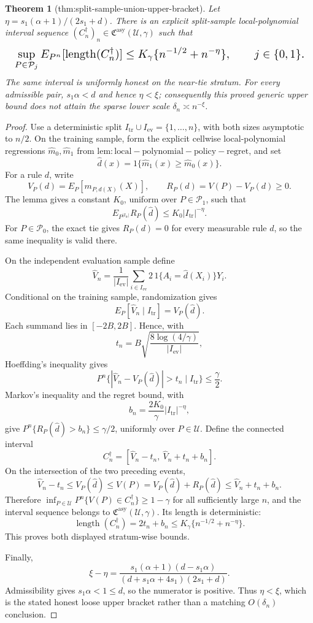 \documentclass{article}
\newtheorem{theorem}{Theorem}
\begin{document}
\begin{theorem}[thm:split-sample-union-upper-bracket]\label{thm:split-sample-union-upper-bracket}
Let \(\eta=s_1(\alpha+1)/(2s_1+d)\).  There is an explicit split-sample local-polynomial interval sequence \((C_n^\dagger)_n\in\mathfrak C^{\mathrm{asy}}(\mathcal U,\gamma)\) such that
\[
\makebox[\linewidth][c]{\resizebox{0.98\linewidth}{!}{\(\displaystyle \sup_{P\in\mathcal P_j}E_{P^n}[\operatorname{length}(C_n^\dagger)]
 \le K_\gamma\{n^{-1/2}+n^{-\eta}\},
 \qquad j\in\{0,1\}.\)}}
\]
The same interval is uniformly honest on the near-tie stratum.  For every admissible pair, \(s_1\alpha<d\) and hence \(\eta<\xi\); consequently this proved generic upper bound does not attain the sparse lower scale \(\delta_n\asymp n^{-\xi}\).
\end{theorem}
\begin{proof}
Use a deterministic split \(I_{\mathrm{tr}}\cup I_{\mathrm{ev}}=\{1,\ldots,n\}\), with both sizes asymptotic to \(n/2\).  On the training sample, form the explicit cellwise local-polynomial regressions \(\widehat m_0,\widehat m_1\) from \(\mathrm{lem:local-polynomial-policy-regret}\), and set
\[
 \widehat d(x)=1\{\widehat m_1(x)\ge\widehat m_0(x)\}.
\]
For a rule \(d\), write
\[
 V_P(d)=E_P[m_{P,d(X)}(X)],
 \qquad
 R_P(d)=V(P)-V_P(d)\ge0.
\]
The lemma gives a constant \(K_0\), uniform over \(P\in\mathcal P_1\), such that
\[
 E_{P^{|I_{\mathrm{tr}}|}}R_P(\widehat d)
 \le K_0|I_{\mathrm{tr}}|^{-\eta}.
\]
For \(P\in\mathcal P_0\), the exact tie gives \(R_P(d)=0\) for every measurable rule \(d\), so the same inequality is valid there.

On the independent evaluation sample define
\[
 \widehat V_n
 =\frac1{|I_{\mathrm{ev}}|}
 \sum_{i\in I_{\mathrm{ev}}}2\,1\{A_i=\widehat d(X_i)\}Y_i.
\]
Conditional on the training sample, randomization gives
\[
 E_P[\widehat V_n\mid I_{\mathrm{tr}}]=V_P(\widehat d).
\]
Each summand lies in \([-2B,2B]\).  Hence, with
\[
 t_n=B\sqrt{\frac{8\log(4/\gamma)}{|I_{\mathrm{ev}}|}},
\]
Hoeffding's inequality gives
\[
 P^n\{|\widehat V_n-V_P(\widehat d)|>t_n\mid I_{\mathrm{tr}}\}\le\frac\gamma2.
\]
Markov's inequality and the regret bound, with
\[
 b_n=\frac{2K_0}{\gamma}|I_{\mathrm{tr}}|^{-\eta},
\]
give \(P^n\{R_P(\widehat d)>b_n\}\le\gamma/2\), uniformly over \(P\in\mathcal U\).  Define the connected interval
\[
 C_n^\dagger=[\widehat V_n-t_n,\ \widehat V_n+t_n+b_n].
\]
On the intersection of the two preceding events,
\[
 \widehat V_n-t_n
 \le V_P(\widehat d)
 \le V(P)=V_P(\widehat d)+R_P(\widehat d)
 \le\widehat V_n+t_n+b_n.
\]
Therefore \(\inf_{P\in\mathcal U}P^n\{V(P)\in C_n^\dagger\}\ge1-\gamma\) for all sufficiently large \(n\), and the interval sequence belongs to \(\mathfrak C^{\mathrm{asy}}(\mathcal U,\gamma)\).  Its length is deterministic:
\[
 \operatorname{length}(C_n^\dagger)=2t_n+b_n
 \le K_\gamma\{n^{-1/2}+n^{-\eta}\}.
\]
This proves both displayed stratum-wise bounds.

Finally,
\[
 \xi-\eta
 =\frac{s_1(\alpha+1)(d-s_1\alpha)}
 {(d+s_1\alpha+4s_1)(2s_1+d)}.
\]
Admissibility gives \(s_1\alpha<1\le d\), so the numerator is positive.  Thus \(\eta<\xi\), which is the stated honest loose upper bracket rather than a matching \(O(\delta_n)\) conclusion.
\end{proof}
\end{document}
